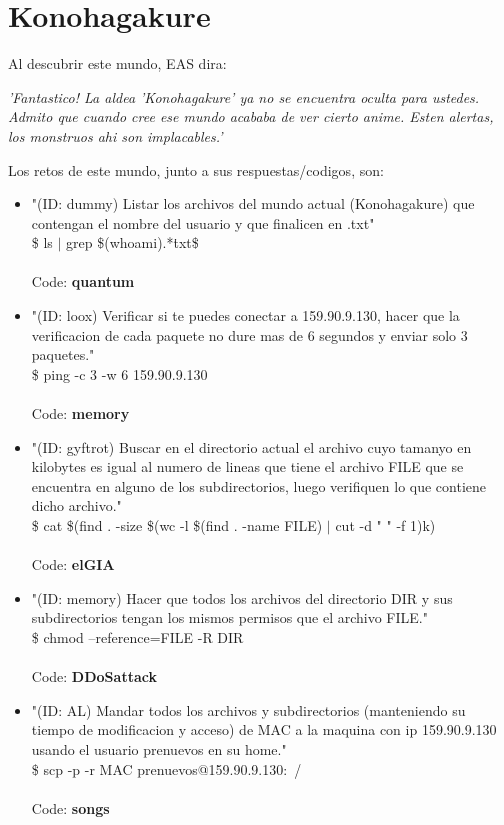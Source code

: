 \documentclass[a4paper,10pt]{article}
\begin{document}
\section{Konohagakure}
	Al descubrir este mundo, EAS dira:
	
	\textit{'Fantastico! La aldea 'Konohagakure' ya no se encuentra oculta para ustedes. Admito que cuando cree ese mundo acababa de ver cierto anime. Esten alertas, los monstruos ahi son implacables.'\\}	

	Los retos de este mundo, junto a sus respuestas/codigos, son:
	
	\begin{itemize}
		\item "(ID: dummy) Listar los archivos del mundo actual (Konohagakure) que contengan el nombre del usuario y que finalicen en .txt" \\ 
			\$ ls $|$ grep \$(whoami).*\.txt\$ \\ \\
			Code: \textbf{quantum}
			
		\item "(ID: loox) Verificar si te puedes conectar a 159.90.9.130, hacer que la verificacion de cada paquete no dure mas de 6 segundos y enviar solo 3 paquetes."\\
			\$ ping -c 3 -w 6 159.90.9.130 \\ \\
			Code: \textbf{memory}
			
		\item "(ID: gyftrot) Buscar en el directorio actual el archivo cuyo tamanyo en kilobytes es igual al numero de lineas que tiene el archivo FILE que se encuentra en alguno de los subdirectorios, luego verifiquen lo que contiene dicho archivo."\\
			\$ cat \$(find . -size \$(wc -l \$(find . -name FILE) $|$ cut -d " " -f 1)k)\\ \\
			Code: \textbf{elGIA}
			
		\item "(ID: memory) Hacer que todos los archivos del directorio DIR y sus subdirectorios tengan los mismos permisos que el archivo FILE."\\
			\$ chmod --reference=FILE -R DIR \\ \\
			Code: \textbf{DDoSattack}
			
		\item "(ID: AL) Mandar todos los archivos y subdirectorios (manteniendo su tiempo de modificacion y acceso) de MAC a la maquina con ip 159.90.9.130 usando el usuario prenuevos en su home."\\
			\$ scp -p -r MAC prenuevos@159.90.9.130:~/ \\ \\
			Code: \textbf{songs}
	\end{itemize}
	
\end{document}
